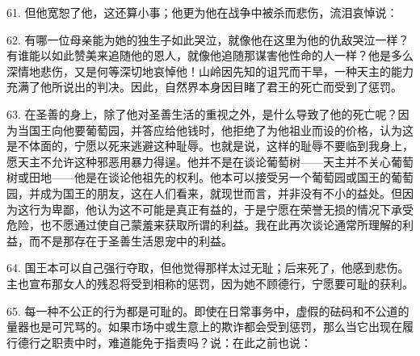 61. 但他宽恕了他，这还算小事；他更为他在战争中被杀而悲伤，流泪哀悼说：\par

62. 有哪一位母亲能为她的独生子如此哭泣，就像他在这里为他的仇敌哭泣一样？有谁能以如此赞美来追随他的恩人，就像他追随那谋害他性命的人一样？他是多么深情地悲伤，又是何等深切地哀悼他！山岭因先知的诅咒而干旱，一种天主的能力充满了他所说出的判决。因此，自然界本身因目睹了君王的死亡而受到了惩罚。\par

63. 在圣善的身上，除了他对圣善生活的重视之外，是什么导致了他的死亡呢？因为当国王向他要葡萄园，并答应给他钱时，他拒绝了为他祖业而设的价格，认为这是不体面的，宁愿以死来逃避这种耻辱。也就是说，这样的耻辱不要临到我身上，愿天主不允许这种邪恶用暴力得逞。他并不是在谈论葡萄树——天主并不关心葡萄树或田地——他是在谈论他祖先的权利。他本可以接受另一个葡萄园或国王的葡萄园，并成为国王的朋友，这在人们看来，就现世而言，并非没有不小的益处。但因为这行为卑鄙，他认为这不可能是真正有益的，于是宁愿在荣誉无损的情况下承受危险，也不愿通过使自己蒙羞来获取所谓的利益。我在此再次谈论通常所理解的利益，而不是那存在于圣善生活恩宠中的利益。\par

64. 国王本可以自己强行夺取，但他觉得那样太过无耻；后来死了，他感到悲伤。主也宣布那女人的残忍将受到相称的惩罚，因为她不顾德行，宁愿要可耻的获利。\par

65. 每一种不公正的行为都是可耻的。即使在日常事务中，虚假的砝码和不公道的量器也是可咒骂的。如果市场中或生意上的欺诈都会受到惩罚，那么当它出现在履行德行之职责中时，难道能免于指责吗？说：在此之前也说：\par


